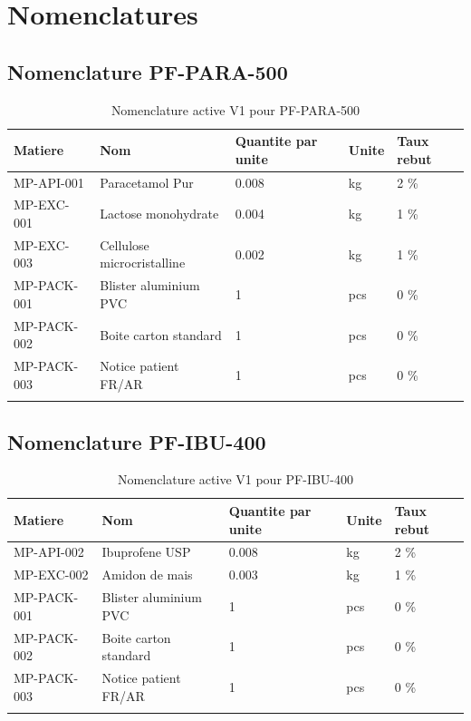 \documentclass[11pt,a4paper]{article}
\begin{document}
\section{Nomenclatures}

\subsection{Nomenclature PF-PARA-500}

\begin{longtable}{|p{3cm}|p{4cm}|p{2cm}|p{2cm}|p{2cm}|}
\hline
\textbf{Matiere} & \textbf{Nom} & \textbf{Quantite par unite} & \textbf{Unite} & \textbf{Taux rebut} \\
\hline
MP-API-001 & Paracetamol Pur & 0.008 & kg & 2 \% \\
\hline
MP-EXC-001 & Lactose monohydrate & 0.004 & kg & 1 \% \\
\hline
MP-EXC-003 & Cellulose microcristalline & 0.002 & kg & 1 \% \\
\hline
MP-PACK-001 & Blister aluminium PVC & 1 & pcs & 0 \% \\
\hline
MP-PACK-002 & Boite carton standard & 1 & pcs & 0 \% \\
\hline
MP-PACK-003 & Notice patient FR/AR & 1 & pcs & 0 \% \\
\hline
\caption{Nomenclature active V1 pour PF-PARA-500}
\end{longtable}

\subsection{Nomenclature PF-IBU-400}

\begin{longtable}{|p{3cm}|p{4cm}|p{2cm}|p{2cm}|p{2cm}|}
\hline
\textbf{Matiere} & \textbf{Nom} & \textbf{Quantite par unite} & \textbf{Unite} & \textbf{Taux rebut} \\
\hline
MP-API-002 & Ibuprofene USP & 0.008 & kg & 2 \% \\
\hline
MP-EXC-002 & Amidon de mais & 0.003 & kg & 1 \% \\
\hline
MP-PACK-001 & Blister aluminium PVC & 1 & pcs & 0 \% \\
\hline
MP-PACK-002 & Boite carton standard & 1 & pcs & 0 \% \\
\hline
MP-PACK-003 & Notice patient FR/AR & 1 & pcs & 0 \% \\
\hline
\caption{Nomenclature active V1 pour PF-IBU-400}
\end{longtable}
\end{document}
